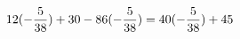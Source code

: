 \documentclass[preview]{standalone}
\begin{document}
\begin{align*}
\special{dvisvgm:raw <g id='unique000'>}12(- \frac{5}{38}) + 30 - 86(- \frac{5}{38}) = 40(- \frac{5}{38}) + 45\special{dvisvgm:raw </g>}
\end{align*}
\end{document}
